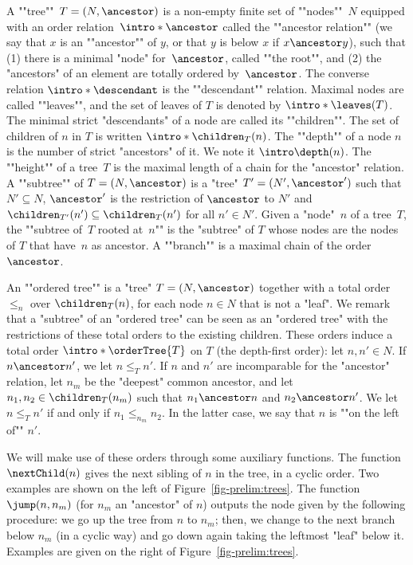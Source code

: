 \documentclass{theoretics}
\begin{document}
\AP A ""tree""~$T=(N,\ancestor)$ is a non-empty finite set of ""nodes""~$N$ equipped with an order relation~$\intro*\ancestor$ called the ""ancestor relation"" (we say that $x$ is an ""ancestor"" of $y$, or that $y$ is below $x$ if $x\ancestor y$), such that
(1) there is a minimal "node" for~$\ancestor$, called ""the root"", and
(2) the "ancestors" of an element are totally ordered by~$\ancestor$.
\AP The converse relation $\intro*\descendant$ is the ""descendant"" relation.
\AP Maximal nodes are called ""leaves"", and the set of leaves of $T$ is denoted by $\intro*\leaves(T)$. 
\AP The minimal strict "descendants" of a node are called its ""children"". The set of children of $n$ in $T$ is written $\intro*\children_T(n)$.
\AP The ""depth"" of a node $n$ is the number of strict "ancestors" of it. We note it $\intro\depth(n)$.
\AP The ""height"" of a tree~$T$ is the maximal length of a chain for the "ancestor" relation. 
\AP A ""subtree""  of $T=(N,\ancestor)$ is a "tree" $T'=(N', \ancestor')$ such that $N'\subseteq N$, $\ancestor'$ is the restriction of $\ancestor$ to $N'$ and $\children_{T'}(n') \subseteq \children_T(n')$ for all $n'\in N'$.
\AP Given a "node"~$n$ of a tree~$T$, the ""subtree of~$T$ rooted at~$n$"" is the "subtree" of $T$ whose nodes are the nodes of $T$ that have~$n$ as ancestor. 
\AP A ""branch"" is a maximal chain of the order $\ancestor$.

 
\AP An ""ordered tree"" is a "tree" $T = (N, \ancestor)$ together with a total order $\leq_n$ over $\children_T(n)$, for each node $n\in N$ that is not a "leaf". We remark that a "subtree" of an "ordered tree" can be seen as an "ordered tree" with the restrictions of these total orders to the existing children. 
\AP These orders induce a total order $\intro*\orderTree{T}$ on $T$ (the depth-first order): let $n, n'\in N$. If $n \ancestor n'$, we let $n \leq_T n'$. If $n$ and $n'$ are incomparable for the "ancestor" relation, let $n_m$ be the "deepest" common ancestor, and let $n_1, n_2\in \children_{T}(n_m)$ such that $n_1\ancestor n$ and $n_2 \ancestor n'$. We let $n \leq_T n'$ if and only if $n_1 \leq_{n_m} n_2$.
\AP In the latter case, we say that $n$ is ""on the left of"" $n'$.


We will make use of these orders through some auxiliary functions.
The function $\nextChild(n)$ gives the next sibling of $n$ in the tree, in a cyclic order. Two examples are shown on the left of Figure~\ref{fig-prelim:trees}.
The function $\jump(n, n_m)$ (for $n_m$ an "ancestor" of $n$) outputs the node given by the following  procedure: we go up the tree from $n$ to $n_m$; then, we change to the next branch below $n_m$ (in a cyclic way) and go down again taking the leftmost "leaf" below it. 
Examples are given on the right of Figure~\ref{fig-prelim:trees}.
\end{document}
